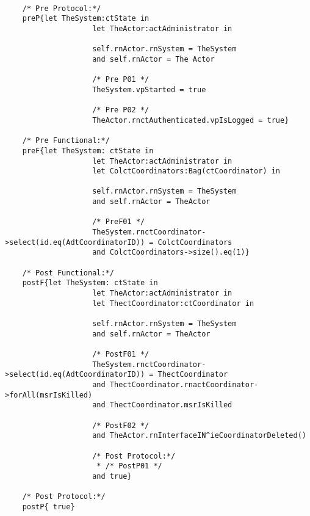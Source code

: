 	\scriptsize
	\vspace{0.5cm}
	\begin{lstlisting}[style=MessirStyle,firstnumber=auto,captionpos=b,caption={\msrmessir (MCL-oriented) specification of the operation \emph{oeDeleteCoordinator}.},label=OM-actAdministrator-oeDeleteCoordinator-MCL-LST]

	/* Pre Protocol:*/ 
	preP{let TheSystem:ctState in
					let TheActor:actAdministrator in
					
					self.rnActor.rnSystem = TheSystem
					and self.rnActor = The Actor
					
					/* Pre P01 */
					TheSystem.vpStarted = true
					
					/* Pre P02 */
					TheActor.rnctAuthenticated.vpIsLogged = true}
	
	/* Pre Functional:*/
	preF{let TheSystem: ctState in
					let TheActor:actAdministrator in
					let ColctCoordinators:Bag(ctCoordinator) in
				
					self.rnActor.rnSystem = TheSystem
					and self.rnActor = TheActor
				
					/* PreF01 */
					TheSystem.rnctCoordinator->select(id.eq(AdtCoordinatorID)) = ColctCoordinators
					and ColctCoordinators->size().eq(1)}
	
	/* Post Functional:*/ 
	postF{let TheSystem: ctState in
					let TheActor:actAdministrator in
					let ThectCoordinator:ctCoordinator in
					
					self.rnActor.rnSystem = TheSystem
					and self.rnActor = TheActor
					
					/* PostF01 */
					TheSystem.rnctCoordinator->select(id.eq(AdtCoordinatorID)) = ThectCoordinator
					and ThectCoordinator.rnactCoordinator->forAll(msrIsKilled)
					and ThectCoordinator.msrIsKilled
					
					/* PostF02 */
					and TheActor.rnInterfaceIN^ieCoordinatorDeleted()
					
					/* Post Protocol:*/
					 * /* PostP01 */
					and true}
	
	/* Post Protocol:*/ 
	postP{ true}
	
	\end{lstlisting}
	\normalsize 
	
	
	
	





